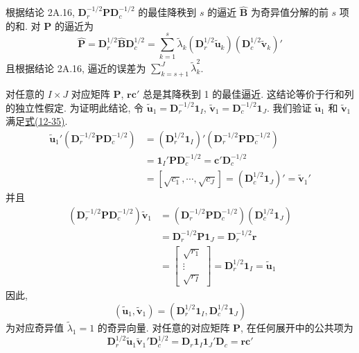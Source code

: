 
根据结论 2A.16, $\mathbf{D}_r^{-1/2}\mathbf{P}\mathbf{D}_c^{-1/2}$ 的最佳降秩到 $s$ 的逼近 $\hat{\mathbf{B}}$ 为奇异值分解的前 $s$ 项的和. 对 $\mathbf{P}$ 的逼近为
\[
\hat{\mathbf{P}}=\mathbf{D}_r^{1/2}\hat{\mathbf{B}}\mathbf{D}_c^{1/2}
=\sum_{k=1}^{s}\tilde{\lambda}_k(\mathbf{D}_r^{1/2}\tilde{\mathbf{u}}_k)(\mathbf{D}_c^{1/2}\tilde{\mathbf{v}}_k)'
\]
且根据结论 2A.16, 逼近的误差为 $\sum_{k=s+1}^{J}\tilde{\lambda}_k^2$.

对任意的 $I\times J$ 对应矩阵 $\mathbf{P}$, $\mathbf{r}\mathbf{c}'$ 总是其降秩到 1 的最佳逼近. 这结论等价于行和列的独立性假定. 为证明此结论, 令 $\tilde{\mathbf{u}}_1=\mathbf{D}_r^{-1/2}\mathbf{1}_I$, $\tilde{\mathbf{v}}_1=\mathbf{D}_c^{-1/2}\mathbf{1}_J$. 我们验证 $\tilde{\mathbf{u}}_1$ 和 $\tilde{\mathbf{v}}_1$ 满足\hyperref[eq:12-35]{式(12-35)}.
\[
\begin{aligned}
\tilde{\mathbf{u}}_1'(\mathbf{D}_r^{-1/2}\mathbf{P}\mathbf{D}_c^{-1/2})
&=(\mathbf{D}_r^{1/2}\mathbf{1}_I)'(\mathbf{D}_r^{-1/2}\mathbf{P}\mathbf{D}_c^{-1/2})\\
&=\mathbf{1}_I'\mathbf{P}\mathbf{D}_c^{-1/2}=\mathbf{c}'\mathbf{D}_c^{-1/2}\\
&=[\sqrt{c_1},\cdots,\sqrt{c_J}]=(\mathbf{D}_c^{1/2}\mathbf{1}_J)'=\tilde{\mathbf{v}}_1'
\end{aligned}
\]
并且
\[
\begin{aligned}
(\mathbf{D}_r^{-1/2}\mathbf{P}\mathbf{D}_c^{-1/2})\tilde{\mathbf{v}}_1
&=(\mathbf{D}_r^{-1/2}\mathbf{P}\mathbf{D}_c^{-1/2})(\mathbf{D}_c^{1/2}\mathbf{1}_J)\\
&=\mathbf{D}_r^{-1/2}\mathbf{P}\mathbf{1}_J=\mathbf{D}_r^{-1/2}\mathbf{r}\\
&=\begin{bmatrix}\sqrt{r_1}\\ \vdots\\ \sqrt{r_I}\end{bmatrix}
=\mathbf{D}_r^{1/2}\mathbf{1}_I=\tilde{\mathbf{u}}_1
\end{aligned}
\]
因此,
\label{eq:12-36}
\begin{equation}
(\tilde{\mathbf{u}}_1,\tilde{\mathbf{v}}_1)=(\mathbf{D}_r^{1/2}\mathbf{1}_I,\mathbf{D}_c^{1/2}\mathbf{1}_J)
\tag{12-36}
\end{equation}
为对应奇异值 $\tilde{\lambda}_1=1$ 的奇异向量. 对任意的对应矩阵 $\mathbf{P}$, 在任何展开中的公共项为
\[
\mathbf{D}_r^{1/2}\tilde{\mathbf{u}}_1\tilde{\mathbf{v}}_1'\mathbf{D}_c^{1/2}
=\mathbf{D}_r\mathbf{1}_I\mathbf{1}_J'\mathbf{D}_c=\mathbf{r}\mathbf{c}'
\]
